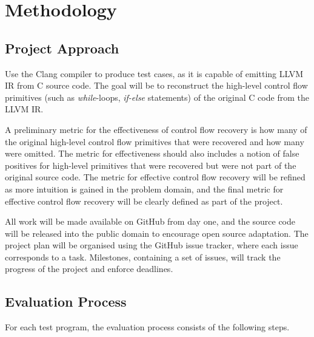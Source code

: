 \documentclass[12pt, a4paper]{article}
\begin{document}
\clearpage


\section{Methodology}


\subsection{Project Approach}

Use the Clang compiler to produce test cases, as it is capable of emitting LLVM IR from C source code. The goal will be to reconstruct the high-level control flow primitives (such as \textit{while}-loops, \textit{if-else} statements) of the original C code from the LLVM IR.

A preliminary metric for the effectiveness of control flow recovery is how many of the original high-level control flow primitives that were recovered and how many were omitted. The metric for effectiveness should also includes a notion of false positives for high-level primitives that were recovered but were not part of the original source code. The metric for effective control flow recovery will be refined as more intuition is gained in the problem domain, and the final metric for effective control flow recovery will be clearly defined as part of the project.

All work will be made available on GitHub from day one, and the source code will be released into the public domain to encourage open source adaptation. The project plan will be organised using the GitHub issue tracker, where each issue corresponds to a task. Milestones, containing a set of issues, will track the progress of the project and enforce deadlines.


\subsection{Evaluation Process}

For each test program, the evaluation process consists of the following steps.
\end{document}
